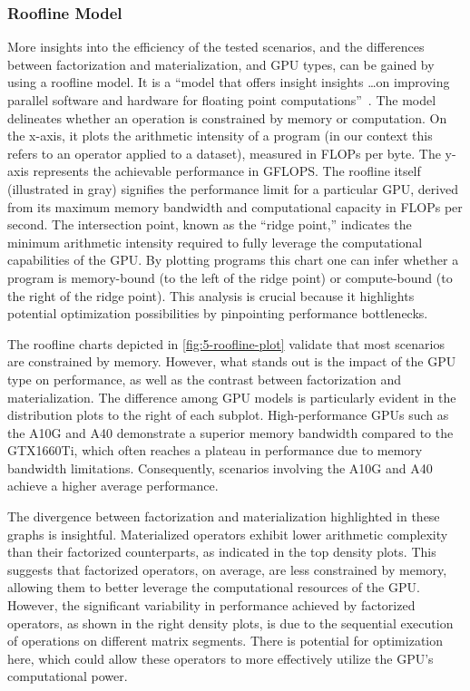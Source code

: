 \subsubsection*{Roofline Model}
More insights into the efficiency of the tested scenarios, and the differences between factorization and materialization, and GPU types, can be gained by using a roofline model. It is a “model that offers insight insights \ldots on improving parallel software and hardware for floating point computations”~\cite{roofline}. The model delineates whether an operation is constrained by memory or computation. On the x-axis, it plots the arithmetic intensity of a program (in our context this refers to an operator applied to a dataset), measured in FLOPs per byte. The y-axis represents the achievable performance in GFLOPS. The roofline itself (illustrated in gray) signifies the performance limit for a particular GPU, derived from its maximum memory bandwidth and computational capacity in FLOPs per second. The intersection point, known as the ``ridge point,'' indicates the minimum arithmetic intensity required to fully leverage the computational capabilities of the GPU. By plotting programs this chart one can infer whether a program is memory-bound (to the left of the ridge point) or compute-bound (to the right of the ridge point). This analysis is crucial because it highlights potential optimization possibilities by pinpointing performance bottlenecks.

The roofline charts depicted in \autoref{fig:5-roofline-plot} validate that most scenarios are constrained by memory. However, what stands out is the impact of the GPU type on performance, as well as the contrast between factorization and materialization. The difference among GPU models is particularly evident in the distribution plots to the right of each subplot. High-performance GPUs such as the A10G and A40 demonstrate a superior memory bandwidth compared to the GTX1660Ti, which often reaches a plateau in performance due to memory bandwidth limitations. Consequently, scenarios involving the A10G and A40 achieve a higher average performance.

The divergence between factorization and materialization highlighted in these graphs is insightful. Materialized operators exhibit lower arithmetic complexity than their factorized counterparts, as indicated in the top density plots. This suggests that factorized operators, on average, are less constrained by memory, allowing them to better leverage the computational resources of the GPU. However, the significant variability in performance achieved by factorized operators, as shown in the right density plots, is due to the sequential execution of operations on different matrix segments. There is potential for optimization here, which could allow these operators to more effectively utilize the GPU’s computational power.

